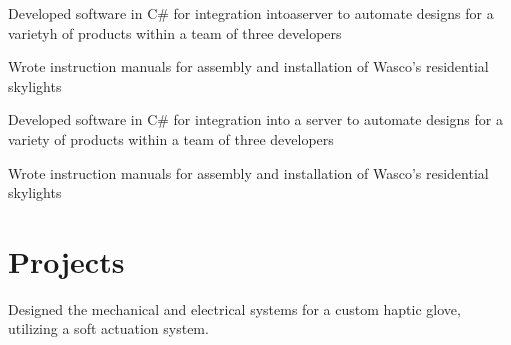\documentclass[letterpaper]{deedy-resume} %
\begin{document}
\begin{minipage}[t]{0.66\textwidth}
\begin{tightitemize}
\item Developed software in C\# for integration intoaserver to automate designs for a varietyh of products within a team of three developers
\item Wrote instruction manuals for assembly and installation of Wasco's residential skylights
\end{tightitemize}

\sectionspace %



\begin{tightitemize}
\item Developed software in C\# for integration into a server to automate designs for a variety of products within a team of three developers
\item Wrote instruction manuals for assembly and installation of Wasco's residential skylights
\end{tightitemize}

\sectionspace %


\section{Projects}


Designed the mechanical and electrical systems for a custom haptic glove, utilizing a soft actuation system.  

\sectionspace %




\end{minipage}
\end{document}
